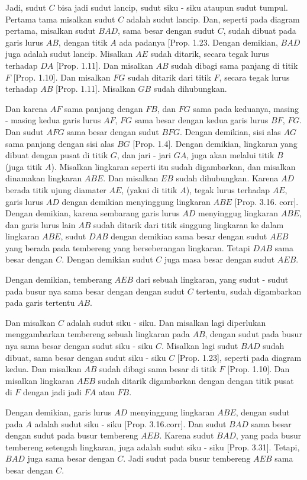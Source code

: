 \documentclass[a4paper]{book}
\begin{document}
Jadi, sudut $C$ bisa jadi sudut lancip, sudut siku - siku ataupun sudut tumpul. 
Pertama tama misalkan sudut $C$ adalah sudut lancip. Dan, seperti pada diagram
pertama, misalkan sudut $BAD$, sama besar dengan sudut $C$, sudah dibuat pada 
garis lurus $AB$, dengan titik $A$ ada padanya [Prop. 1.23. Dengan demikian, $BAD$
juga adalah sudut lancip. Misalkan $AE$ sudah ditarik, secara tegak lurus terhadap
$DA$ [Prop. 1.11]. Dan misalkan $AB$ sudah dibagi sama panjang di titik $F$ 
[Prop. 1.10]. Dan misalkan $FG$ sudah ditarik dari titik $F$, secara tegak lurus
terhadap $AB$ [Prop. 1.11]. Misalkan $GB$ sudah dihubungkan.

Dan karena $AF$ sama panjang dengan $FB$, dan $FG$ sama pada keduanya, masing - masing 
kedua garis lurus $AF$, $FG$ sama besar dengan kedua garis lurus $BF$, $FG$. Dan 
sudut $AFG$ sama besar dengan sudut $BFG$. Dengan demikian, sisi alas $AG$ sama
panjang dengan sisi alas $BG$ [Prop. 1.4]. Dengan demikian, lingkaran yang dibuat
dengan pusat di titik $G$, dan jari - jari $GA$, juga akan melalui titik $B$ (juga
titik $A$). Misalkan lingkaran seperti itu sudah digambarkan, dan misalkan dinamakan
lingkaran $ABE$. Dan misalkan $EB$ sudah dihubungkan. Karena $AD$ berada titik ujung
diamater $AE$, (yakni di titik $A$), tegak lurus terhadap $AE$, garis lurus $AD$ 
dengan demikian menyinggung lingkaran $ABE$ [Prop. 3.16. corr]. Dengan demikian,
karena sembarang garis lurus $AD$ menyinggug lingkaran $ABE$, dan garis lurus lain
$AB$ sudah ditarik dari titik singgung lingkaran ke dalam lingkaran $ABE$, sudut 
$DAB$ dengan demikian sama besar dengan sudut $AEB$ yang berada pada tembereng yang
berseberangan lingkaran. Tetapi $DAB$ sama besar dengan $C$. Dengan demikian
sudut $C$ juga masa besar dengan sudut $AEB$.

Dengan demikian, temberang $AEB$ dari sebuah lingkaran, yang sudut - sudut pada 
busur nya sama besar dengan dengan sudut $C$ tertentu, sudah digambarkan pada garis
tertentu $AB$.

Dan misalkan $C$ adalah sudut siku - siku. Dan misalkan lagi diperlukan menggambarkan
tembereng sebuah lingkaran pada $AB$, dengan sudut pada busur nya sama besar dengan
sudut siku - siku $C$. Misalkan lagi sudut $BAD$ sudah dibuat, sama besar dengan
sudut siku - siku $C$ [Prop. 1.23], seperti pada diagram kedua. Dan misalkan $AB$
sudah dibagi sama besar di titik $F$ [Prop. 1.10]. Dan misalkan lingkaran $AEB$ sudah
ditarik digambarkan dengan dengan titik pusat di $F$ dengan jadi jadi $FA$ atau $FB$.

Dengan demikian, garis lurus $AD$ menyinggung lingkaran $ABE$, dengan sudut pada $A$
adalah sudut siku - siku [Prop. 3.16.corr]. Dan sudut $BAD$ sama besar dengan sudut
pada busur tembereng $AEB$. Karena sudut $BAD$, yang pada busur tembereng setengah
lingkaran, juga adalah sudut siku - siku [Prop. 3.31]. Tetapi, $BAD$ juga sama besar
dengan $C$. Jadi sudut pada busur tembereng $AEB$ sama besar dengan $C$.
\end{document}
